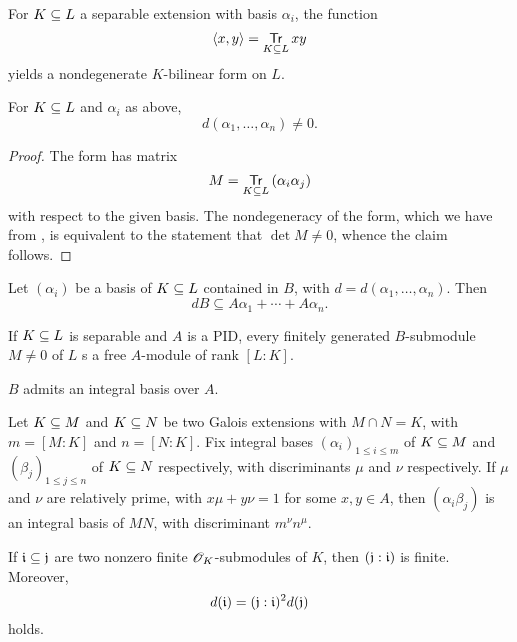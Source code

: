 \begin{prop}%
  \label{trace-form-bilinear}

  For $\ringExtension L K$ a separable extension with basis $\alpha_i$, the
  function \[ \left\langle x,y\right\rangle = \Tr{xy}\] yields a nondegenerate
  $K$-bilinear form on $L$.
\end{prop}

\begin{corollary} For $\ringExtension L K$ and $\alpha_i$ as above,
  \[d(\alpha_1,\ldots,\alpha_n) \neq 0.\]
\end{corollary}

\begin{proof}
  The form has matrix \[ M = \Tr {(\alpha_i\alpha_j)} \] with respect to the
  given basis. The nondegeneracy of the form, which we have from
  , is equivalent to the statement that $\det M \ne
  0$, whence the claim follows.
\end{proof}

\begin{lemma}
  Let $(\alpha_i)$ be a basis of $\ringExtension L K$ contained in $B$, with $d
  = d(\alpha_1,\ldots,\alpha_n)$. Then \[ dB \subseteq A\alpha_1 + \cdots +
  A\alpha_n. \]
\end{lemma}

\begin{prop}
  If $\ringExtension L K$ is separable and $A$ is a PID, every finitely
  generated $B$-submodule $M\ne 0$ of $L$ s a free $A$-module of rank $[L:K]$.
\end{prop}
\begin{corollary}
  $B$ admits an integral basis over $A$.
\end{corollary}

\begin{prop}
  Let $\ringExtension M K$ and $\ringExtension N K$ be two Galois extensions
  with $M \cap N = K$, with $m = [M:K]$ and $n = [N:K]$. Fix integral bases
  $(\alpha_i)_{1 \le i \le m}$ of $\ringExtension M K$ and $(\beta_j)_{1 \le j
  \le n}$ of $\ringExtension N K$ respectively, with discriminants $\mu$ and
  $\nu$ respectively. If $\mu$ and $\nu$ are relatively prime, with $x\mu+y\nu
  = 1$ for some $x,y\in A$, then $(\alpha_i\beta_j)$ is an integral basis of
  $MN$, with discriminant $m^\nu n^\mu$.
\end{prop}


\begin{prop}
  If $\fI \subseteq \fJ$ are two nonzero finite $\ko_K$-submodules of $K$, then
  $(\fJ:\fI)$ is finite. Moreover,
  \[ d(\fI) = (\fJ:\fI)^2d(\fJ) \] holds.
\end{prop}
